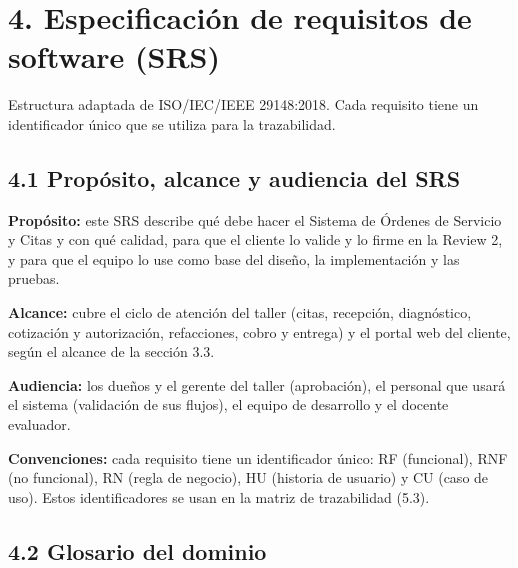 \section{4. Especificación de requisitos de software
(SRS)}\label{especificaciuxf3n-de-requisitos-de-software-srs}

Estructura adaptada de ISO/IEC/IEEE 29148:2018. Cada requisito tiene un
identificador único que se utiliza para la trazabilidad.

\subsection{4.1 Propósito, alcance y audiencia del
SRS}\label{propuxf3sito-alcance-y-audiencia-del-srs}

\textbf{Propósito:} este SRS describe qué debe hacer el Sistema de
Órdenes de Servicio y Citas y con qué calidad, para que el cliente lo
valide y lo firme en la Review 2, y para que el equipo lo use como base
del diseño, la implementación y las pruebas.

\textbf{Alcance:} cubre el ciclo de atención del taller (citas,
recepción, diagnóstico, cotización y autorización, refacciones, cobro y
entrega) y el portal web del cliente, según el alcance de la sección
3.3.

\textbf{Audiencia:} los dueños y el gerente del taller (aprobación), el
personal que usará el sistema (validación de sus flujos), el equipo de
desarrollo y el docente evaluador.

\textbf{Convenciones:} cada requisito tiene un identificador único: RF
(funcional), RNF (no funcional), RN (regla de negocio), HU (historia de
usuario) y CU (caso de uso). Estos identificadores se usan en la matriz
de trazabilidad (5.3).

\subsection{4.2 Glosario del dominio}\label{glosario-del-dominio}

